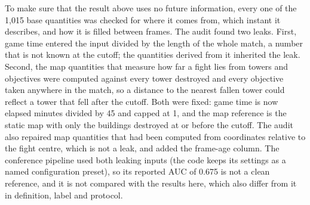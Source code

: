 To make sure that the result above uses no future information, every one of the 1,015 base quantities was
checked for where it comes from, which instant it describes, and how it is filled between frames. The
audit found two leaks. First, game time entered the input divided by the length of the whole match, a
number that is not known at the cutoff; the quantities derived from it inherited the leak. Second, the
map quantities that measure how far a fight lies from towers and objectives were computed against every
tower destroyed and every objective taken anywhere in the match, so a distance to the nearest fallen tower
could reflect a tower that fell after the cutoff. Both were fixed: game time is now elapsed minutes
divided by 45 and capped at 1, and the map reference is the static map with only the buildings destroyed
at or before the cutoff. The audit also repaired map quantities that had been computed from coordinates
relative to the fight centre, which is not a leak, and added the frame-age column. The conference pipeline
used both leaking inputs (the code keeps its settings as a named configuration preset), so its reported
AUC of 0.675 is not a clean reference, and it is not compared with the results here, which also differ
from it in definition, label and protocol.

